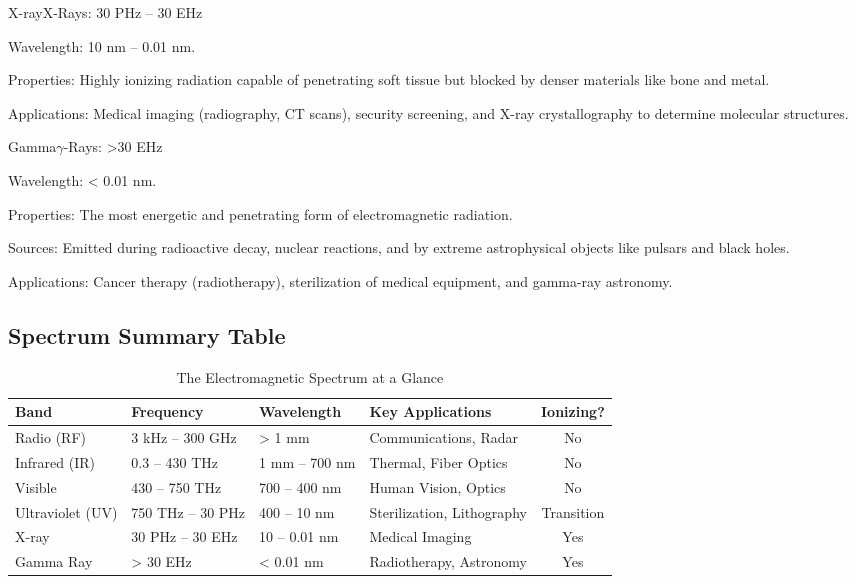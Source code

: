 \begin{spectrumband}{X-ray}{X-Rays: 30 PHz -- 30 EHz}
    \item[Wavelength:] 10 nm -- 0.01 nm.
    \item[Properties:] Highly ionizing radiation capable of penetrating soft tissue but blocked by denser materials like bone and metal.
    \item[Applications:] Medical imaging (radiography, CT scans), security screening, and X-ray crystallography to determine molecular structures.
\end{spectrumband}

\begin{spectrumband}{Gamma}{$\gamma$-Rays: >30 EHz}
    \item[Wavelength:] < 0.01 nm.
    \item[Properties:] The most energetic and penetrating form of electromagnetic radiation.
    \item[Sources:] Emitted during radioactive decay, nuclear reactions, and by extreme astrophysical objects like pulsars and black holes.
    \item[Applications:] Cancer therapy (radiotherapy), sterilization of medical equipment, and gamma-ray astronomy.
\end{spectrumband}

\subsection{Spectrum Summary Table}
\begin{table}[H]
    \centering
    \caption{The Electromagnetic Spectrum at a Glance}
    \label{tab:spectrum-summary}
    \begin{tabularx}{\textwidth}{@{}llXXc@{}}
        \toprule
        \tableheaderfont Band & \tableheaderfont Frequency & \tableheaderfont Wavelength & \tableheaderfont Key Applications & \tableheaderfont Ionizing? \\
        \midrule
        Radio (RF) & 3 kHz -- 300 GHz & > 1 mm & Communications, Radar & No \\
        Infrared (IR) & 0.3 -- 430 THz & 1 mm -- 700 nm & Thermal, Fiber Optics & No \\
        Visible & 430 -- 750 THz & 700 -- 400 nm & Human Vision, Optics & No \\
        Ultraviolet (UV) & 750 THz -- 30 PHz & 400 -- 10 nm & Sterilization, Lithography & Transition \\
        X-ray & 30 PHz -- 30 EHz & 10 -- 0.01 nm & Medical Imaging & Yes \\
        Gamma Ray & > 30 EHz & < 0.01 nm & Radiotherapy, Astronomy & Yes \\
        \bottomrule
    \end{tabularx}
\end{table}

